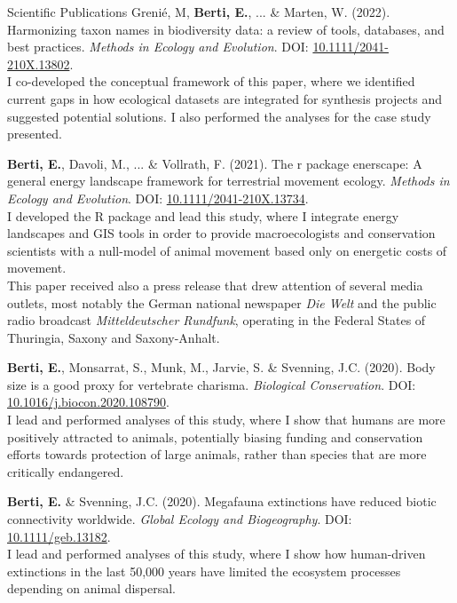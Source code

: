 \documentclass{resume} %
\begin{document}
\begin{rSection}{Scientific Publications}
Grenié, M, \textbf{Berti, E.}, ... \& Marten, W. (2022). Harmonizing taxon names in biodiversity data: a review of tools, databases, and best practices. \textit{Methods in Ecology and Evolution}. DOI: \href{https://doi.org/10.1111/2041-210X.13802}{10.1111/2041-210X.13802}.\\
I co-developed the conceptual framework of this paper, where we identified current gaps in how ecological datasets are integrated for synthesis projects and suggested potential solutions. I also performed the analyses for the case study presented.

\textbf{Berti, E.}, Davoli, M., ... \& Vollrath, F. (2021). The r package enerscape: A general energy landscape framework for terrestrial movement ecology. \textit{Methods in Ecology and Evolution}. DOI: \href{https://doi.org/10.1111/2041-210X.13734}{10.1111/2041-210X.13734}.\\
I developed the R package and lead this study, where I integrate energy landscapes and GIS tools in order to provide macroecologists and conservation scientists with a null-model of animal movement based only on energetic costs of movement.\\
This paper received also a press release that drew attention of several media outlets, most notably the German national newspaper \textit{Die Welt} and the public radio broadcast \textit{Mitteldeutscher Rundfunk}, operating in the Federal States of Thuringia, Saxony and Saxony-Anhalt.

\textbf{Berti, E.}, Monsarrat, S., Munk, M., Jarvie, S. \& Svenning, J.C. (2020). Body size is a good proxy for vertebrate charisma. \textit{Biological Conservation}. DOI: \href{https://doi.org/10.1016/j.biocon.2020.108790}{10.1016/j.biocon.2020.108790}.\\
I lead and performed analyses of this study, where I show that humans are more positively attracted to animals, potentially biasing funding and conservation efforts towards protection of large animals, rather than species that are more critically endangered.

\textbf{Berti, E.} \& Svenning, J.C. (2020). Megafauna extinctions have reduced biotic connectivity worldwide. \textit{Global Ecology and Biogeography}. DOI: \href{https://doi.org/10.1111/geb.13182}{10.1111/geb.13182}.\\
I lead and performed analyses of this study, where I show how human-driven extinctions in the last 50,000 years have limited the ecosystem processes depending on animal dispersal.
\end{rSection}
\end{document}
